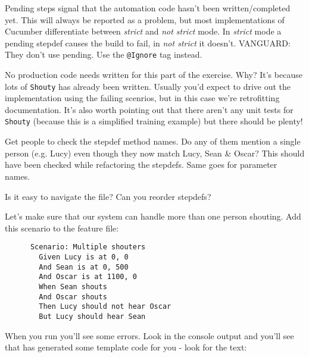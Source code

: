 
    Pending steps signal that the automation code hasn't been written/completed yet. This will always be reported as a problem, but most implementations of Cucumber differentiate between \emph{strict} and \emph{not strict} mode. In \emph{strict} mode a pending stepdef causes the build to fail, in \emph{not strict} it doesn't.   VANGUARD: They don't use pending. Use the \texttt{@Ignore} tag instead.
    
    No production code needs written for this part of the exercise. Why? It's because lots of \texttt{Shouty} has already been written. Usually you'd expect to drive out the implementation using the failing scenrios, but in this case we're retrofitting documentation. It's also worth pointing out that there aren't any unit tests for \texttt{Shouty} (because this is a simplified training example) but there should be plenty!
    
    Get people to check the stepdef method names. Do any of them mention a single person (e.g. Lucy) even though they now match Lucy, Sean \& Oscar? This should have been checked while refactoring the stepdefs. Same goes for parameter names.
    
    Is it easy to navigate the file? Can you reorder stepdefs?
\fi 

\ifcontent 
    Let's make sure that our system can handle more than one person shouting. Add this scenario to the feature file:
    
    \begin{verbatim}
      Scenario: Multiple shouters
        Given Lucy is at 0, 0
        And Sean is at 0, 500
        And Oscar is at 1100, 0
        When Sean shouts
        And Oscar shouts
        Then Lucy should not hear Oscar
        But Lucy should hear Sean
    \end{verbatim}
    
    When you run \CUKE{} you'll see some errors. Look in the console output and you'll see that \CUKE{} has generated some template code for you - look for the text:
    
    
